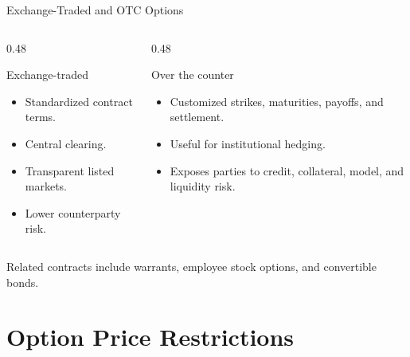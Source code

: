 \documentclass[aspectratio=169,11pt]{beamer}
\begin{document}
\begin{frame}{Exchange-Traded and OTC Options}
    \begin{columns}[T]
        \begin{column}{0.48\textwidth}
            \begin{block}{Exchange-traded}
                \begin{itemize}
                    \item Standardized contract terms.
                    \item Central clearing.
                    \item Transparent listed markets.
                    \item Lower counterparty risk.
                \end{itemize}
            \end{block}
        \end{column}
        \begin{column}{0.48\textwidth}
            \begin{block}{Over the counter}
                \begin{itemize}
                    \item Customized strikes, maturities, payoffs, and settlement.
                    \item Useful for institutional hedging.
                    \item Exposes parties to credit, collateral, model, and liquidity risk.
                \end{itemize}
            \end{block}
        \end{column}
    \end{columns}

    \vspace{0.5em}
    Related contracts include warrants, employee stock options, and convertible bonds.
\end{frame}

\section{Option Price Restrictions}
\end{document}
